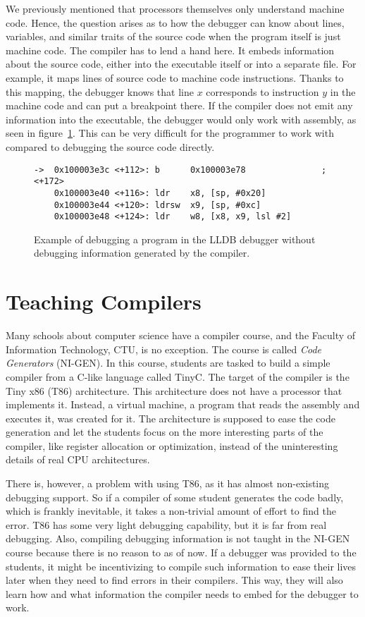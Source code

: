 We previously mentioned that processors themselves only understand machine
code. Hence, the question arises as to how the debugger can know about lines,
variables, and similar traits of the source code when the program itself is
just machine code. The compiler has to lend a hand here. It embeds information
about the source code, either into the executable itself or into a separate
file. For example, it maps lines of source code to machine code instructions.
Thanks to this mapping, the debugger knows that line $x$ corresponds to
instruction $y$ in the machine code and can put a breakpoint there. If the
compiler does not emit any information into the executable, the debugger would
only work with assembly, as seen in figure~\ref{fig:lldb-debug2}. This can be
very difficult for the programmer to work with compared to debugging the source
code directly.

\begin{figure}
\begin{lstlisting}
->  0x100003e3c <+112>: b      0x100003e78               ; <+172>
    0x100003e40 <+116>: ldr    x8, [sp, #0x20]
    0x100003e44 <+120>: ldrsw  x9, [sp, #0xc]
    0x100003e48 <+124>: ldr    w8, [x8, x9, lsl #2]
\end{lstlisting}
\caption{Example of debugging a program in the LLDB debugger without debugging
    information generated by the compiler.}
\label{fig:lldb-debug2}
\end{figure}

\section{Teaching Compilers}
Many schools about computer science have a compiler course, and the Faculty of
Information Technology, CTU, is no exception. The course is called \textit{Code
Generators} (NI-GEN). In this course, students are tasked to build a simple
compiler from a C-like language called TinyC. The target of the compiler is the
Tiny x86 (T86) architecture. This architecture does not have a processor that
implements it. Instead, a virtual machine, a program that reads the assembly
and executes it, was created for it. The architecture is supposed to ease the
code generation and let the students focus on the more interesting parts of the
compiler, like register allocation or optimization, instead of the
uninteresting details of real CPU architectures.

There is, however, a problem with using T86, as it has almost non-existing
debugging support. So if a compiler of some student generates the code badly,
which is frankly inevitable, it takes a non-trivial amount of effort to find
the error. T86 has some very light debugging capability, but it is far from
real debugging. Also, compiling debugging information is not taught in the
NI-GEN course because there is no reason to as of now. If a debugger was
provided to the students, it might be incentivizing to compile such information
to ease their lives later when they need to find errors in their compilers.
This way, they will also learn how and what information the compiler needs to
embed for the debugger to work.

